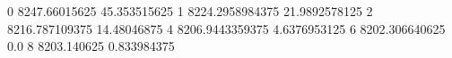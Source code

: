 0 8247.66015625 45.353515625
1 8224.2958984375 21.9892578125
2 8216.787109375 14.48046875
4 8206.9443359375 4.6376953125
6 8202.306640625 0.0
8 8203.140625 0.833984375
